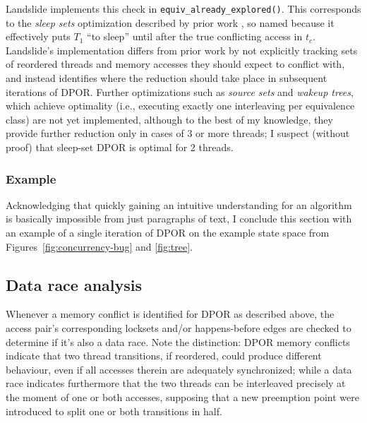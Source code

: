 Landslide implements this check in {\tt equiv\_already\_explored()}.
This corresponds to the {\em sleep sets} optimization described by prior work \cite{partial-order-methods,dpor,optimal-dpor},
so named because it effectively puts $T_1$ ``to sleep'' until after the true conflicting access in $t_c$.
Landslide's implementation differs from prior work by not explicitly tracking
sets of reordered threads and memory accesses they should expect to conflict with,
and instead identifies where the reduction should take place in subsequent iterations of DPOR.
Further optimizations such as {\em source sets} and {\em wakeup trees},
which achieve optimality (i.e., executing exactly one interleaving per equivalence class) \cite{optimal-dpor}
are not yet implemented,
although to the best of my knowledge,
they provide further reduction only in cases of 3 or more threads;
I suspect (without proof) that sleep-set DPOR is optimal for 2 threads.


\subsubsection{Example}

Acknowledging that quickly gaining an intuitive understanding for an algorithm
is basically impossible from just paragraphs of text,
I conclude this section with an example of a single iteration of DPOR
on the example state space from Figures~\ref{fig:concurrency-bug} and \ref{fig:tree}.



\subsection{Data race analysis}
\label{sec:landslide-datarace}

Whenever a memory conflict is identified for DPOR as described above,
the access pair's corresponding locksets and/or happens-before edges are checked to determine if it's also a data race.
Note the distinction: DPOR memory conflicts indicate that two thread transitions,
if reordered, could produce different behaviour, even if all accesses therein are adequately synchronized;
while a data race indicates furthermore that the two threads can be interleaved precisely at the moment of one or both accesses,
supposing that a new preemption point were introduced to split one or both transitions in half.

